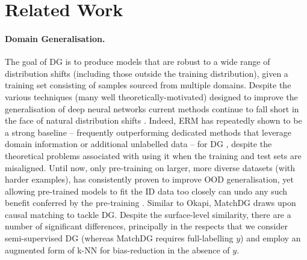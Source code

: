 \section{Related Work}\label{sec:related_work}
\paragraph{Domain Generalisation.} 
%
The goal of \acf{DG} is to produce models that are robust to a wide range of distribution shifts
(including those outside the training distribution), given a training set consisting of samples
sourced from multiple domains.
%
Despite the various techniques (many well theoretically-motivated) designed to improve the
generalisation of deep neural networks current methods continue to fall short in the face of
natural distribution shifts \citep{gulrajani2020search, koh2021wilds}.
%
Indeed, ERM has repeatedly shown to be a strong baseline -- frequently outperforming dedicated
methods that leverage domain information or additional unlabelled data -- for \ac{DG}
\citep{gulrajani2020search, SagWeiLeeGaoetal22}, despite the theoretical problems associated with
using it when the training and test sets are misaligned.
%
Until now, only pre-training on larger, more diverse datasets (with harder examples), has
consistently proven to improve OOD generalisation, yet allowing pre-trained models to fit the ID
data too closely can undo any such benefit conferred by the pre-training
\citep{andreassen2021evolution, kim2022broad, taori2020measuring, wiles2022a}.
%
%
Similar to Okapi, MatchDG \citep{mahajan2021domain} draws upon causal matching to tackle \ac{DG}.
Despite the surface-level similarity, there are a number of significant differences, principally in
the respects that we consider semi-supervised \ac{DG} (whereas MatchDG requires full-labelling
\wrt{} $y$) and employ an augmented form of k-NN for bias-reduction in the absence of $y$.

